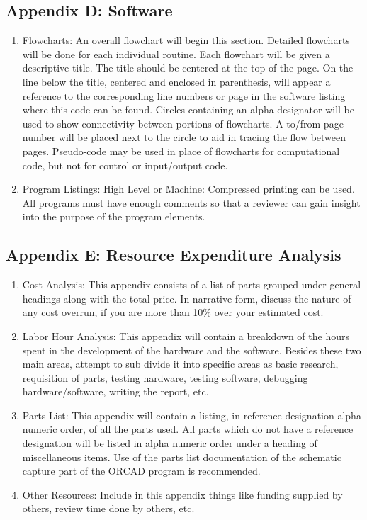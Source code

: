 \documentclass[12pt]{article}
\begin{document}
\subsection*{Appendix D: Software}
\begin{enumerate}[noitemsep]
    \item Flowcharts: An overall flowchart will begin this section. Detailed flowcharts will be done for each individual routine. Each flowchart will be given a descriptive title. The title should be centered at the top of the page. On the line below the title, centered and enclosed in parenthesis, will appear a reference to the corresponding line numbers or page in the software listing where this code can be found. Circles containing an alpha designator will be used to show connectivity between portions of flowcharts. A to/from page number will be placed next to the circle to aid in tracing the flow between pages. Pseudo-code may be used in place of flowcharts for computational code, but not for control or input/output code.
    \item Program Listings: High Level or Machine: Compressed printing can be used. All programs must have enough comments so that a reviewer can gain insight into the purpose of the program elements.
\end{enumerate}

\subsection*{Appendix E: Resource Expenditure Analysis}
\begin{enumerate}[noitemsep]
    \item Cost Analysis: This appendix consists of a list of parts grouped under general headings along with the total price. In narrative form, discuss the nature of any cost overrun, if you are more than 10\% over your estimated cost.
    \item Labor Hour Analysis: This appendix will contain a breakdown of the hours spent in the development of the hardware and the software. Besides these two main areas, attempt to sub divide it into specific areas as basic research, requisition of parts, testing hardware, testing software, debugging hardware/software, writing the report, etc.
    \item Parts List: This appendix will contain a listing, in reference designation alpha numeric order, of all the parts used. All parts which do not have a reference designation will be listed in alpha numeric order under a heading of miscellaneous items. Use of the parts list documentation of the schematic capture part of the ORCAD program is recommended.
    \item Other Resources: Include in this appendix things like funding supplied by others, review time done by others, etc.
\end{enumerate}
\end{document}
